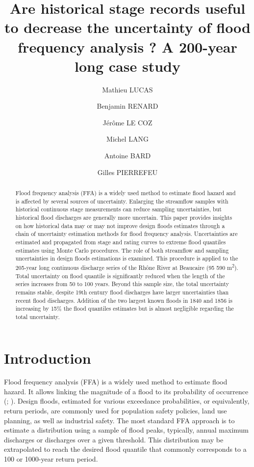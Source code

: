 \documentclass[11pt]{article}
\title{Are historical stage records useful to decrease the uncertainty of flood frequency analysis ? A 200-year long case study}
\author[1]{Mathieu LUCAS}
\author[1]{Benjamin RENARD}
\author[1]{Jérôme LE COZ}
\author[1]{Michel LANG}
\author[2]{Antoine BARD}
\author[3]{Gilles PIERREFEU}
\affil[1]{INRAE Riverly, Villeurbanne}
\affil[2]{ESDB, Briançon}
\affil[3]{CNR, Lyon}
\begin{document}
\maketitle

\begin{abstract}
    
    Flood frequency analysis (FFA) is a widely used method to estimate flood hazard and is affected by several sources of uncertainty. Enlarging the streamflow samples with historical continuous stage measurements can reduce sampling uncertainties, but historical flood discharges are generally more uncertain. This paper provides insights on how historical data may or may not improve design floods estimates through a chain of uncertainty estimation methods for flood frequency analysis. Uncertainties are estimated and propagated from stage and rating curves to extreme flood quantiles estimates using Monte Carlo procedures. The role of both streamflow and sampling uncertainties in design floods estimations is examined. This procedure  is applied to the 205-year long continuous discharge series of the Rhône River at Beaucaire (95 590 m\textsuperscript{2}). Total uncertainty on flood quantile is significantly reduced when the length of the series increases from 50 to 100 years. Beyond this sample size, the total uncertainty remains stable, despite 19th century flood discharges have larger uncertainties than recent flood discharges. Addition of the two largest known floods in 1840 and 1856 is increasing by 15\% the flood quantiles estimates but is almost negligible regarding the total uncertainty.  
    
\end{abstract}

\section{Introduction}
    \paragraph{}
    Flood frequency analysis (FFA) is a widely used method to estimate flood hazard. It allows linking the magnitude of a flood to its probability of occurrence (\citet{hamed_flood_2019}; \citet{jain_design_2019}). Design floods, estimated for various exceedance probabilities, or equivalently, return periods, are commonly used for population safety policies, land use planning, as well as industrial safety. The most standard FFA approach is to estimate a distribution using a sample of flood peaks, typically, annual maximum discharges or discharges over a given threshold. This distribution may be extrapolated to reach the desired flood quantile that commonly corresponds to a 100 or 1000-year return period. 
    
\end{document}
